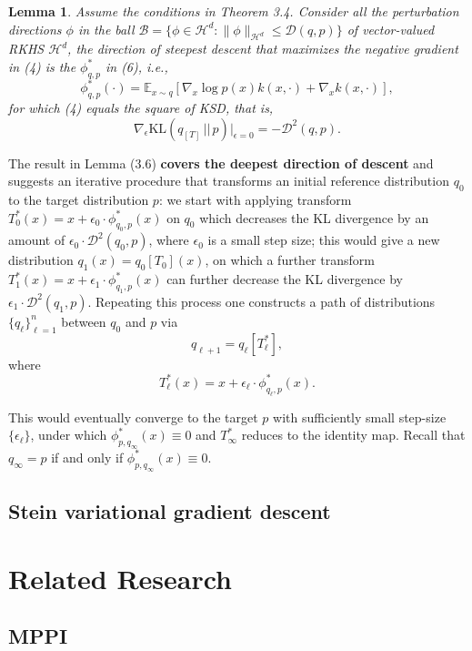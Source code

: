 \documentclass{article}
\newtheorem{lemma}[theorem]{Lemma} %
\begin{document}
\begin{tcolorbox}
\begin{lemma}
 Assume the conditions in Theorem 3.4. Consider all the perturbation directions \( \phi \) in the ball \( \mathcal{B} = \{ \phi \in \mathcal{H}^d : \| \phi \|_{\mathcal{H}^d} \leq \mathcal{D}(q, p) \} \) of vector-valued RKHS \( \mathcal{H}^d \), the direction of steepest descent that maximizes the negative gradient in (4) is the \( \phi^*_{q, p} \) in (6), i.e.,
\begin{equation}
    \phi^*_{q, p}(\cdot) = \mathbb{E}_{x \sim q} [\nabla_x \log p(x) k(x, \cdot) + \nabla_x k(x, \cdot)],
\end{equation}
for which (4) equals the square of KSD, that is,
\[
    \nabla_\epsilon \text{KL}(q_{[T]} \,||\, p) \big|_{\epsilon=0} = -\mathcal{D}^2(q, p).
\]
\end{lemma}
\end{tcolorbox}


The result in Lemma (3.6) \textbf{covers the deepest direction of descent} and suggests an iterative procedure that transforms an initial reference distribution \( q_0 \) to the target distribution \( p \): we start with applying transform \( T_0^*(x) = x + \epsilon_0 \cdot \phi^*_{q_0, p}(x) \) on \( q_0 \) which decreases the KL divergence by an amount of \( \epsilon_0 \cdot \mathcal{D}^2(q_0, p) \), where \( \epsilon_0 \) is a small step size; this would give a new distribution \( q_1(x) = q_0[T_0](x) \), on which a further transform \( T_1^*(x) = x + \epsilon_1 \cdot \phi^*_{q_1, p}(x) \) can further decrease the KL divergence by \( \epsilon_1 \cdot \mathcal{D}^2(q_1, p) \). Repeating this process one constructs a path of distributions \( \{ q_\ell \}_{\ell=1}^n \) between \( q_0 \) and \( p \) via
\[
    q_{\ell+1} = q_\ell[T_\ell^*],
\]
where
\begin{equation}
    T_\ell^*(x) = x + \epsilon_\ell \cdot \phi^*_{q_\ell, p}(x).
\end{equation}

This would eventually converge to the target \( p \) with sufficiently small step-size \( \{ \epsilon_\ell \} \), under which \( \phi^*_{p, q_\infty}(x) \equiv 0 \) and \( T_\infty^* \) reduces to the identity map. Recall that \( q_\infty = p \) if and only if \( \phi^*_{p, q_\infty}(x) \equiv 0 \).

\subsection{Stein variational gradient descent}

\section{Related Research}
\subsection{MPPI}
\end{document}

